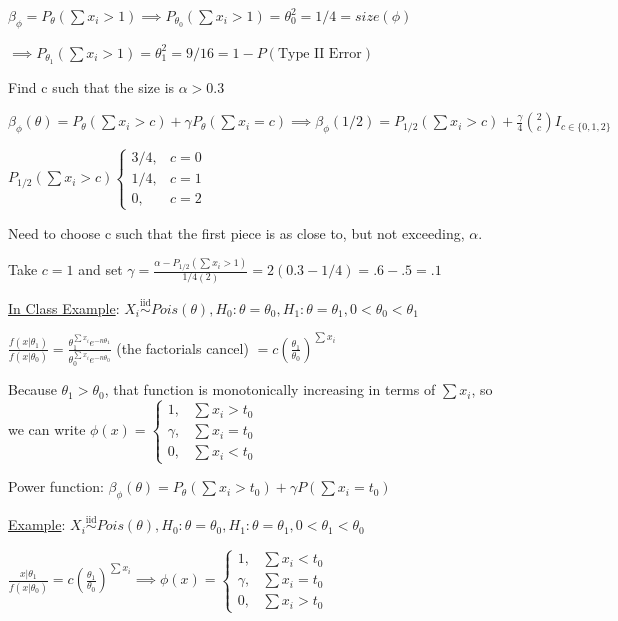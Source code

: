 \documentclass{article}
\let\Oldsum=\sum
\renewcommand{\sum}{\Oldsum\limits}
\newcommand{\iiddist}{\overset{\mathrm{iid}}{\sim}}
\begin{document}
$\beta_{\phi} = P_{\theta}(\sum x_i > 1) \implies P_{\theta_0}(\sum x_i > 1) = \theta_0^2 = 1/4 = size(\phi)$

$\implies P_{\theta_1}(\sum x_i > 1) = \theta_1^2 = 9/16 = 1 - P(\text{Type II Error})$

Find c such that the size is $\alpha > 0.3$

$\beta_{\phi}(\theta) = P_{\theta}(\sum x_i > c) + \gamma P_{\theta}(\sum x_i = c) \implies \beta_{\phi}(1/2) = P_{1/2}(\sum x_i > c) + \frac{\gamma}{4} \binom{2}{c}I_{c \in \{0, 1, 2\}}$

$P_{1/2}(\sum x_i > c) \begin{cases} 3/4, & c = 0 \\ 1/4, & c = 1 \\ 0, & c = 2 \end{cases}$

Need to choose c such that the first piece is as close to, but not exceeding, $\alpha$. 

Take $c = 1$ and set $\gamma = \frac{\alpha - P_{1/2}(\sum x_i > 1)}{1/4(2)} = 2(0.3 - 1/4) = .6 - .5 = .1$



\underline{In Class Example}: $X_i \iiddist Pois(\theta), H_0: \theta = \theta_0, H_1: \theta = \theta_1, 0 < \theta_0 < \theta_1$

$\frac{f(x|\theta_1)}{f(x|\theta_0)} = \frac{\theta_1^{\sum x_i} e^{-n\theta_1}}{\theta_0^{\sum x_i} e^{-n\theta_0}}$ (the factorials cancel) $ = c(\frac{\theta_1}{\theta_0})^{\sum x_i}$

Because $\theta_1 > \theta_0$, that function is monotonically increasing in terms of $\sum x_i$, so we can write $\phi(x) = \begin{cases} 1, &\sum x_i > t_0 \\ \gamma, &\sum x_i = t_0 \\ 0, &\sum x_i < t_0 \end{cases}$

Power function: $\beta_{\phi}(\theta) = P_{\theta}(\sum x_i > t_0) + \gamma P(\sum x_i = t_0)$


\underline{Example}: $X_i \iiddist Pois(\theta), H_0: \theta = \theta_0, H_1: \theta = \theta_1, 0 < \theta_1 < \theta_0$

$\frac{x|\theta_1}{f(x|\theta_0)} = c(\frac{\theta_1}{\theta_0})^{\sum x_i} \implies \phi(x) = \begin{cases} 1, &\sum x_i < t_0 \\ \gamma, &\sum x_i = t_0 \\ 0, &\sum x_i > t_0 \end{cases}$
\end{document}
